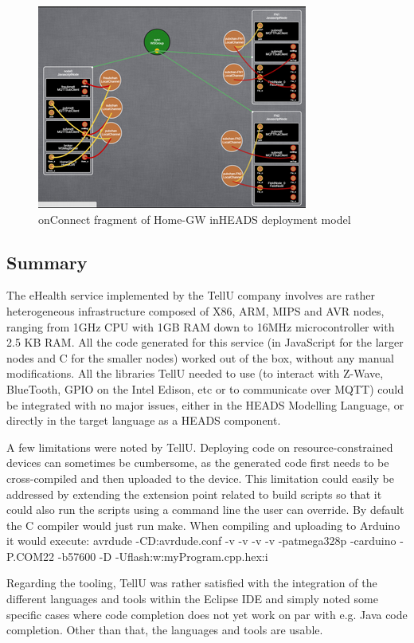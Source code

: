 \begin{figure}[h]
	\centering
	\includegraphics[width=1\linewidth]{figures/fig8}
	\caption{onConnect fragment of Home-GW inHEADS deployment model}
	\label{fig:fig8}
\end{figure}

\subsection{Summary}
The eHealth service implemented by the TellU company involves are rather heterogeneous infrastructure composed of X86, ARM, MIPS and AVR nodes, ranging from 1GHz CPU with 1GB RAM down to 16MHz microcontroller with 2.5 KB RAM. All the code generated for this service (in JavaScript for the larger nodes and C for the smaller nodes) worked out of the box, without any manual modifications. All the libraries TellU needed to use (to interact with Z-Wave, BlueTooth, GPIO on the Intel Edison, etc or to communicate over MQTT) could be integrated with no major issues, either in the HEADS Modelling Language, or directly in the target language as a HEADS component.  

A few limitations were noted by TellU. Deploying code on resource-constrained devices can sometimes be cumbersome, as the generated code first needs to be cross-compiled and then uploaded to the device. This limitation could easily be addressed by extending the extension point related to build scripts so that it could also run the scripts using a command line the user can override. By default the C compiler would just run make. When compiling and uploading to Arduino it would execute: avrdude -CD:avrdude.conf -v -v -v -v -patmega328p -carduino -P.COM22 -b57600 -D -Uflash:w:myProgram.cpp.hex:i 

Regarding the tooling, TellU was rather satisfied with the integration of the different languages and tools within the Eclipse IDE and simply noted some specific cases where code completion does not yet work on par with e.g. Java code completion. Other than that, the languages and tools are usable.
